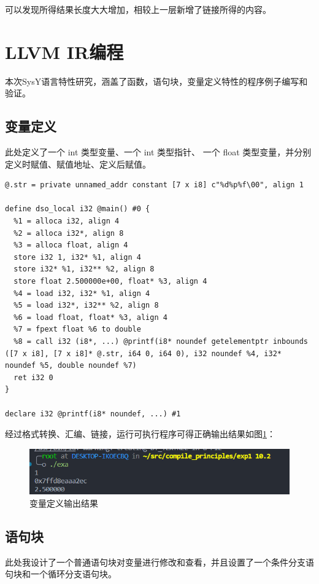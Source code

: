 \documentclass[UTF8,a4paper,10pt]{ctexart}
\begin{document}
可以发现所得结果长度大大增加，相较上一层新增了链接所得的内容。

\section{LLVM IR编程}
本次SysY语言特性研究，涵盖了函数，语句块，变量定义特性的程序例子编写和验证。

\subsection{变量定义}
此处定义了一个 int 类型变量、一个 int 类型指针、 一个 float 类型变量，并分别定义时赋值、赋值地址、定义后赋值。

\begin{verbatim}
@.str = private unnamed_addr constant [7 x i8] c"%d%p%f\00", align 1

define dso_local i32 @main() #0 {
  %1 = alloca i32, align 4
  %2 = alloca i32*, align 8
  %3 = alloca float, align 4
  store i32 1, i32* %1, align 4
  store i32* %1, i32** %2, align 8
  store float 2.500000e+00, float* %3, align 4
  %4 = load i32, i32* %1, align 4
  %5 = load i32*, i32** %2, align 8
  %6 = load float, float* %3, align 4
  %7 = fpext float %6 to double
  %8 = call i32 (i8*, ...) @printf(i8* noundef getelementptr inbounds ([7 x i8], [7 x i8]* @.str, i64 0, i64 0), i32 noundef %4, i32* noundef %5, double noundef %7)
  ret i32 0
}

declare i32 @printf(i8* noundef, ...) #1

\end{verbatim}

经过格式转换、汇编、链接，运行可执行程序可得正确输出结果如图\ref{pic:7}：
\begin{figure}[H]
  \centering
  \includegraphics[width=\textwidth]{figure/exa.png}
  \caption{变量定义输出结果}
  \label{pic:7}
\end{figure}

\subsection{语句块}
此处我设计了一个普通语句块对变量进行修改和查看，并且设置了一个条件分支语句块和一个循环分支语句块。
\end{document}
